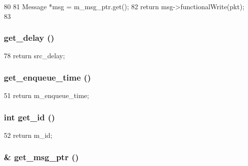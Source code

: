 \begin{DoxyCode}
80 {
81     Message *msg = m_msg_ptr.get();
82     return msg->functionalWrite(pkt);
83 }
\end{DoxyCode}
\hypertarget{classflit__d_a0b5775391c8bacccecf70b147a7dd3e6}{
\subsubsection[{get\_\-delay}]{ get\_\-delay ()}}
\label{classflit__d_a0b5775391c8bacccecf70b147a7dd3e6}



\begin{DoxyCode}
78 { return src_delay; }
\end{DoxyCode}
\hypertarget{classflit__d_a8b7947d2d5ef2f4c39d644d6b8070acb}{
\subsubsection[{get\_\-enqueue\_\-time}]{ get\_\-enqueue\_\-time ()}}
\label{classflit__d_a8b7947d2d5ef2f4c39d644d6b8070acb}



\begin{DoxyCode}
51 { return m_enqueue_time; }
\end{DoxyCode}
\hypertarget{classflit__d_a1f0b8f09abd10342468ce33a1da15557}{
\subsubsection[{get\_\-id}]{\setlength{\rightskip}{0pt plus 5cm}int get\_\-id ()}}
\label{classflit__d_a1f0b8f09abd10342468ce33a1da15557}



\begin{DoxyCode}
52 { return m_id; }
\end{DoxyCode}
\hypertarget{classflit__d_a9f89b30096bceae33be8dffc50b8b936}{
\subsubsection[{get\_\-msg\_\-ptr}]{\& get\_\-msg\_\-ptr ()}}
\label{classflit__d_a9f89b30096bceae33be8dffc50b8b936}



